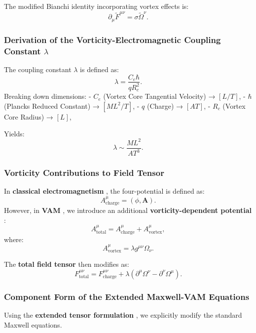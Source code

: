 The modified Bianchi identity incorporating vortex effects is:
\begin{equation*}
    \partial_\mu \tilde{F}^{\mu\nu} = \sigma \tilde{\Omega}^\nu.
\end{equation*}

\subsubsection*{Derivation of the Vorticity-Electromagnetic Coupling Constant \( \lambda \)}
The coupling constant \( \lambda \) is defined as:
\begin{equation*}
    \lambda = \frac{C_e \hbar}{q R_c^2}.
\end{equation*}
Breaking down dimensions:
- \( C_e \) (Vortex Core Tangential Velocity) → \( [L/T] \),
- \( \hbar \) (Planck\rqs s Reduced Constant) → \( [M L^2 / T] \),
- \( q \) (Charge) → \( [A T] \),
- \( R_c \) (Vortex Core Radius) → \( [L] \),

Yields:
\begin{equation*}
    \lambda \sim \frac{M L^2}{A T^3}.
\end{equation*}

\subsubsection*{Vorticity Contributions to Field Tensor}
In \textbf{classical electromagnetism} , the four-potential is defined as:
\begin{equation*}
    A^\mu_\text{charge} = \left( \phi, \mathbf{A} \right).
\end{equation*}
However, in \textbf{VAM} , we introduce an additional \textbf{vorticity-dependent potential} :
\begin{equation*}
    A^\mu_\text{total} = A^\mu_\text{charge} + A^\mu_\text{vortex},
\end{equation*}
where:
\begin{equation*}
    A^\mu_\text{vortex} = \lambda g^{\mu\nu} \Omega_\nu.
\end{equation*}

The \textbf{total field tensor}  then modifies as:
\begin{equation*}
    F^{\mu\nu}_\text{total} = F^{\mu\nu}_\text{charge} + \lambda (\partial^\mu \Omega^\nu - \partial^\nu \Omega^\mu).
\end{equation*}

\subsubsection*{Component Form of the Extended Maxwell-VAM Equations}
Using the \textbf{extended tensor formulation} , we explicitly modify the standard Maxwell equations.

